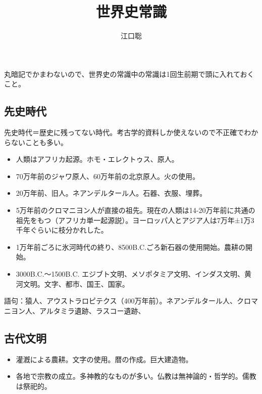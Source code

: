\documentclass[twocolumn,autodetect-engine,dvipdfmx-if-dvi,ja=standard]{jsarticle} \usepackage{mystyle}
\author{江口聡}
\title{世界史常識}
\begin{document}
\maketitle
\else\chapter{}\fi


丸暗記でかまわないので、世界史の常識中の常識は1回生前期で頭に入れておくこと。


\section{先史時代}

先史時代＝歴史に残ってない時代。考古学的資料しか使えないので不正確でわからないことも多い。

\begin{itemize}
\item 人類はアフリカ起源。ホモ・エレクトゥス、原人。
  \item 70万年前のジャワ原人、60万年前の北京原人。火の使用。
  \item   20万年前、旧人。ネアンデルタール人。石器、衣服、埋葬。
  
\item 5万年前のクロマニヨン人が直接の祖先。現在の人類は14-20万年前に共通の祖先をもつ（アフリカ単一起源説）。ヨーロッパ人とアジア人は7万年±1万3千年ぐらいに枝分かれした。
\item 1万年前ごろに氷河時代の終り、8500B.C.ごろ新石器の使用開始。農耕の開始。
\item 3000B.C.〜1500B.C. エジブト文明、メソポタミア文明、インダス文明、黄河文明。文字、都市、国王、国家。

\end{itemize}

語句：猿人、アウストラロピテクス（400万年前）。ネアンデルタール人、クロマニヨン人、アルタミラ遺跡、ラスコー遺跡、





\section{古代文明}
\begin{itemize}
\item 灌漑による農耕。文字の使用。暦の作成。巨大建造物。
\item 各地で宗教の成立。多神教的なものが多い。仏教は無神論的・哲学的。儒教は祭祀的。

\end{itemize}
\end{document}
